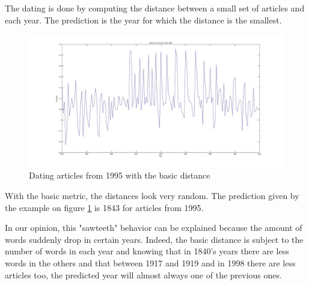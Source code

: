The dating is done by computing the distance between a small set of articles and each year. The prediction is the year for which the distance is the smallest.
\begin{figure}[H]
	\centering
        \includegraphics[scale=0.15]{Pictures/date_articles/distance1/dating1995_corrected.jpg}
        \caption{Dating articles from 1995 with the basic distance}
        \label{date_d1}
\end{figure}
With the basic metric, the distances look very random. The prediction given by the example on figure \ref{date_d1} is 1843 for articles from 1995.

In our opinion, this "sawteeth" behavior can be explained because the amount of words suddenly drop in certain years. Indeed, the basic distance is subject to the number of words in each year and knowing that in 1840's years there are less words in the others and that between 1917 and 1919 and in 1998 there are less articles too, the predicted year will almost always one of the previous ones.